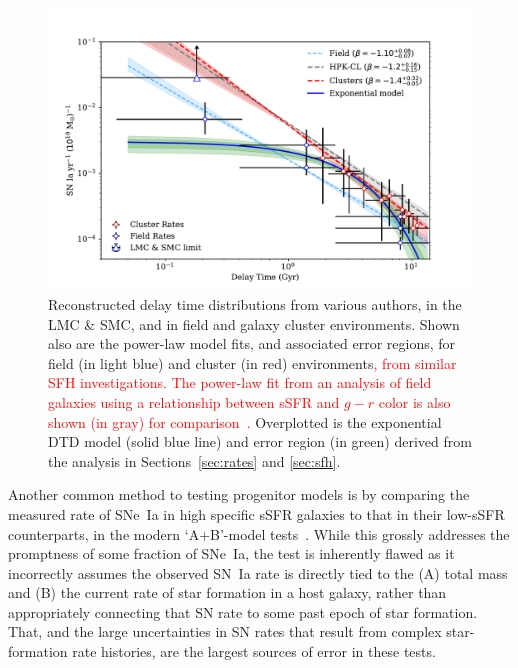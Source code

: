 \documentclass[apj, linenumbers]{aastex62}
\begin{document}
\begin{figure}[t] 
   \centering
   \includegraphics[width=6.1in]{figure_loglog_dtd.pdf}
   \caption{\footnotesize Reconstructed delay time distributions from various authors, in the LMC \& SMC, and in field and galaxy cluster environments. Shown also are the power-law model fits, and associated error regions, for field (in light blue) and cluster (in red) environments\textcolor{red}{, from similar SFH investigations. The power-law fit from an analysis of field galaxies using a relationship between sSFR and $g-r$ color is also shown (in gray) for comparison~\citep[HPK-CL,][]{Heringer:2019ws}. }Overplotted is the exponential DTD model (solid blue line) and error region (in green) derived from the analysis in Sections~\ref{sec:rates} and \ref{sec:sfh}. }
   \label{fig:logsnrate}
\end{figure}

Another common method to testing progenitor models is by comparing the measured rate of SNe~Ia in high specific sSFR galaxies to that in their low-sSFR counterparts, in the modern `A+B'-model tests~\citep{Scannapieco:2005, Andersen:2018dp}. While this grossly addresses the promptness of some fraction of SNe~Ia, the test is inherently flawed as it incorrectly assumes the observed SN~Ia rate is directly tied to the (A) total mass and (B) the current rate of star formation in a host galaxy, rather than appropriately connecting that SN rate to some past epoch of star formation. That, and the large uncertainties in SN rates that result from complex star-formation rate histories, are the largest sources of error in these tests.
\end{document}
